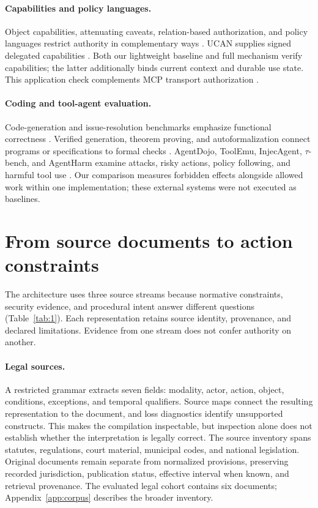 \documentclass{article}
\begin{document}
\paragraph{Capabilities and policy languages.}
Object capabilities, attenuating caveats, relation-based authorization, and policy languages restrict authority in complementary ways \citep{miller2006robust,birgisson2014macaroons,pang2019zanzibar,cutler2024cedar}. UCAN supplies signed delegated capabilities \citep{ucan}. Both our lightweight baseline and full mechanism verify capabilities; the latter additionally binds current context and durable use state. This application check complements MCP transport authorization \citep{mcp-auth}.

\paragraph{Coding and tool-agent evaluation.}
Code-generation and issue-resolution benchmarks emphasize functional correctness \citep{chen2021codex,jimenez2024swebench}. Verified generation, theorem proving, and autoformalization connect programs or specifications to formal checks \citep{sun2024clover,yang2023leandojo,wu2022autoformalization}. AgentDojo, ToolEmu, InjecAgent, $\tau$-bench, and AgentHarm examine attacks, risky actions, policy following, and harmful tool use \citep{debenedetti2024agentdojo,ruan2024toolemu,zhan2024injecagent,yao2024taubench,andriushchenko2025agentharm}. Our comparison measures forbidden effects alongside allowed work within one implementation; these external systems were not executed as baselines.

\section{From source documents to action constraints}
\label{sec:sources}

The architecture uses three source streams because normative constraints, security evidence, and procedural intent answer different questions (Table~\ref{tab:1}). Each representation retains source identity, provenance, and declared limitations. Evidence from one stream does not confer authority on another.



\paragraph{Legal sources.}
A restricted grammar extracts seven fields: modality, actor, action, object, conditions, exceptions, and temporal qualifiers. Source maps connect the resulting representation to the document, and loss diagnostics identify unsupported constructs. This makes the compilation inspectable, but inspection alone does not establish whether the interpretation is legally correct. The source inventory spans statutes, regulations, court material, municipal codes, and national legislation. Original documents remain separate from normalized provisions, preserving recorded jurisdiction, publication status, effective interval when known, and retrieval provenance. The evaluated legal cohort contains six documents; Appendix~\ref{app:corpus} describes the broader inventory.
\end{document}
